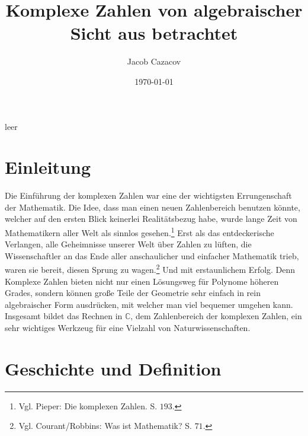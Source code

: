 \documentclass[a4paper,12pt]{article} %
\author{Jacob Cazacov}
\title{Komplexe Zahlen von algebraischer Sicht aus betrachtet}
\date{\today}
\begin{document}

\maketitle

\thispagestyle{empty}

\newpage
 leer
\thispagestyle{empty}

\newpage





\tableofcontents

\thispagestyle{empty}

\newpage


\section{Einleitung}

Die Einführung der komplexen Zahlen war eine der wichtigsten Errungenschaft der Mathematik.
Die Idee, dass man einen neuen Zahlenbereich benutzen könnte, welcher auf den ersten Blick keinerlei Realitätsbezug habe, wurde lange Zeit von Mathematikern aller Welt als sinnlos gesehen.\footnote{Vgl. Pieper: Die komplexen Zahlen. S. $193$.}
Erst als das entdeckerische Verlangen, alle Geheimnisse unserer Welt über Zahlen zu lüften, die Wissenschaftler an das Ende aller anschaulicher und einfacher Mathematik trieb, waren sie bereit, diesen Sprung zu wagen.\footnote{Vgl. Courant/Robbins: Was ist Mathematik? S. $71$.}
Und mit erstaunlichem Erfolg.
Denn Komplexe Zahlen bieten nicht nur einen Lösungsweg für Polynome höheren Grades, sondern können große Teile der Geometrie sehr einfach in rein algebraischer Form ausdrücken, mit welcher man viel bequemer umgehen kann.
Insgesamt bildet das Rechnen in $\mathbb{C}$, dem Zahlenbereich der komplexen Zahlen, ein sehr wichtiges Werkzeug für eine Vielzahl von Naturwissenschaften.

\section{Geschichte und Definition}
\end{document}
